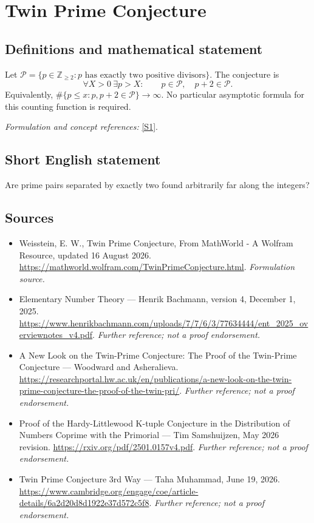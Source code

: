 \documentclass[11pt]{article}
\begin{document}
\section*{\texorpdfstring{Twin Prime Conjecture}{Twin Prime Conjecture}}\label{20}
\subsection{Definitions and mathematical statement}
Let $\mathcal P=\{p\in{\mathbb{Z}}_{\ge2}:p\text{ has exactly two positive divisors}\}$. The conjecture is
\[
 \forall X>0\ \exists p>X:\qquad p\in\mathcal P,\quad p+2\in\mathcal P.
\]
Equivalently, $\#\{p\le x:p,p+2\in\mathcal P\}\to\infty$. No particular asymptotic formula for this counting function is required.
\par\smallskip\textit{Formulation and concept references:} \href{https://mathworld.wolfram.com/TwinPrimeConjecture.html}{[S1]}.

\subsection{Short English statement}
Are prime pairs separated by exactly two found arbitrarily far along the integers?
\subsection{Sources}
\begin{itemize}
\item[S1]Weisstein, E. W., Twin Prime Conjecture, From MathWorld - A Wolfram Resource, updated 16 August 2026.
\url{https://mathworld.wolfram.com/TwinPrimeConjecture.html}.
\textit{Formulation source.}
\item[S2]Elementary Number Theory — Henrik Bachmann, version 4, December 1, 2025.
\url{https://www.henrikbachmann.com/uploads/7/7/6/3/77634444/ent_2025_overviewnotes_v4.pdf}.
\textit{Further reference; not a proof endorsement.}
\item[S3]A New Look on the Twin-Prime Conjecture: The Proof of the Twin-Prime Conjecture — Woodward and Asheralieva.
\url{https://researchportal.hw.ac.uk/en/publications/a-new-look-on-the-twin-prime-conjecture-the-proof-of-the-twin-pri/}.
\textit{Further reference; not a proof endorsement.}
\item[S4]Proof of the Hardy-Littlewood K-tuple Conjecture in the Distribution of Numbers Coprime with the Primorial — Tim Samshuijzen, May 2026 revision.
\url{https://rxiv.org/pdf/2501.0157v4.pdf}.
\textit{Further reference; not a proof endorsement.}
\item[S5]Twin Prime Conjecture 3rd Way — Taha Muhammad, June 19, 2026.
\url{https://www.cambridge.org/engage/coe/article-details/6a2d20d8d1922e37d572c5f8}.
\textit{Further reference; not a proof endorsement.}
\end{itemize}
\end{document}
